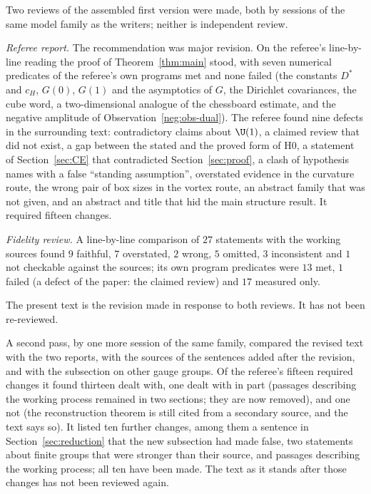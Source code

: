 Two reviews of the assembled first version were made, both by sessions of the same model family as the writers; neither is independent review.

\emph{Referee report.} The recommendation was major revision. On the referee's line-by-line reading the proof of Theorem~\ref{thm:main} stood, with seven numerical predicates of the referee's own programs met and none failed (the constants $D^*$ and $c_H$, $G(0)$, $G(1)$ and the asymptotics of $G$, the Dirichlet covariances, the cube word, a two-dimensional analogue of the chessboard estimate, and the negative amplitude of Observation~\ref{neg:obs-dual}). The referee found nine defects in the surrounding text: contradictory claims about $\U(1)$, a claimed review that did not exist, a gap between the stated and the proved form of H0, a statement of Section~\ref{sec:CE} that contradicted Section~\ref{sec:proof}, a clash of hypothesis names with a false ``standing assumption'', overstated evidence in the curvature route, the wrong pair of box sizes in the vortex route, an abstract family that was not given, and an abstract and title that hid the main structure result. It required fifteen changes.

\emph{Fidelity review.} A line-by-line comparison of $27$ statements with the working sources found $9$ faithful, $7$ overstated, $2$ wrong, $5$ omitted, $3$ inconsistent and $1$ not checkable against the sources; its own program predicates were $13$ met, $1$ failed (a defect of the paper: the claimed review) and $17$ measured only.

The present text is the revision made in response to both reviews. It has not been re-reviewed.

A second pass, by one more session of the same family, compared the revised text with the two reports, with the sources of the sentences added after the revision, and with the subsection on other gauge groups. Of the referee's fifteen required changes it found thirteen dealt with, one dealt with in part (passages describing the working process remained in two sections; they are now removed), and one not (the reconstruction theorem is still cited from a secondary source, and the text says so). It listed ten further changes, among them a sentence in Section~\ref{sec:reduction} that the new subsection had made false, two statements about finite groups that were stronger than their source, and passages describing the working process; all ten have been made. The text as it stands after those changes has not been reviewed again.

